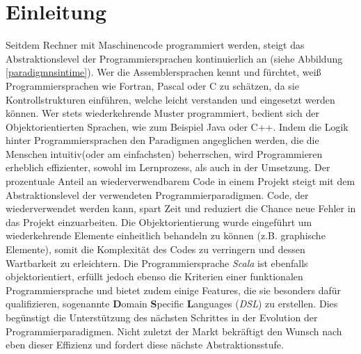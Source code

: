 \chapter{Einleitung}
Seitdem Rechner mit Maschinencode programmiert werden, steigt das Abstraktionslevel der Programmiersprachen kontinuierlich an (siehe Abbildung \ref{paradigmnsintime}). Wer die Assemblersprachen kennt und fürchtet, weiß Programmiersprachen wie Fortran, Pascal oder C zu schätzen, da sie Kontrollstrukturen einführen, welche leicht verstanden und eingesetzt werden können. Wer stets wiederkehrende Muster programmiert, bedient sich der Objektorientierten Sprachen, wie zum Beispiel Java oder C++.
Indem die Logik hinter Programmiersprachen den Paradigmen angeglichen werden, die die Menschen intuitiv(oder am einfachsten) beherrschen, wird Programmieren erheblich effizienter, sowohl im Lernprozess, als auch in der Umsetzung. 
Der prozentuale Anteil an wiederverwendbarem Code in einem Projekt steigt mit dem Abstraktionslevel der verwendeten Programmierparadigmen. Code, der wiederverwendet werden kann, spart Zeit und reduziert die Chance neue Fehler in das Projekt einzuarbeiten. Die Objektorientierung wurde eingeführt um wiederkehrende Elemente einheitlich behandeln zu können (z.B. graphische Elemente), somit die Komplexität des Codes zu verringern und dessen Wartbarkeit zu erleichtern. Die Programmiersprache \textit{Scala} ist ebenfalls objektorientiert, erfüllt jedoch ebenso die Kriterien einer funktionalen Programmiersprache und bietet zudem einige Features, die sie besonders dafür qualifizieren, sogenannte \textbf{D}omain \textbf{S}pecific \textbf{L}anguages (\textit{DSL}) zu erstellen. Dies begünstigt die Unterstützung des nächsten Schrittes in der Evolution der Programmierparadigmen. Nicht zuletzt der Markt bekräftigt den Wunsch nach eben dieser Effizienz und fordert diese nächste Abstraktionsstufe. 
